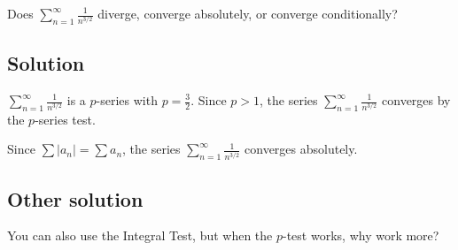 \documentclass{article}
\begin{document}
\noindent
Does $\displaystyle \sum_{n=1}^\infty \frac{1}{n^{3/2}}$
diverge, converge absolutely, or converge conditionally?

\subsection*{Solution}

$\displaystyle \sum_{n=1}^\infty \frac{1}{n^{3/2}}$ is a $p$-series with $p=\frac32$. Since $p>1$, the series $\displaystyle \sum_{n=1}^\infty \frac{1}{n^{3/2}}$ converges by the $p$-series test. 

Since $\sum |a_n| = \sum a_n$, the series $\displaystyle \sum_{n=1}^\infty  \frac{1}{n^{3/2}}$ converges absolutely.

\subsection*{Other solution}

You can also use the Integral Test, but when the $p$-test works, why work more?
\end{document}
